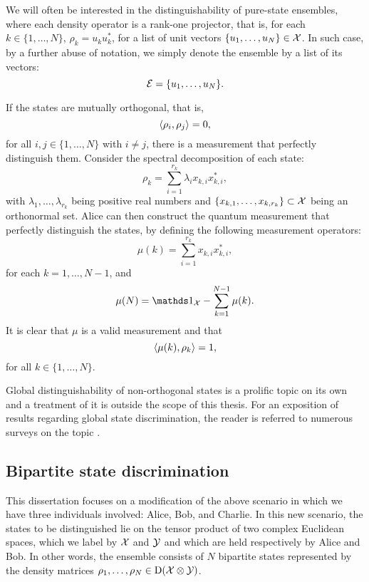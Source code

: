 We will often be interested in the distinguishability of pure-state ensembles,
where each density operator is a rank-one projector, that is, for each 
$k \in \{1, \ldots, N\}$, $\rho_{k} = u_{k}u_{k}^{\ast}$, 
for a list of unit vectors $\{u_{1}, \ldots, u_{N}\} \in \mathcal{X}$. 
In such case, by a further abuse of notation, we simply denote the ensemble by 
a list of its vectors:
\begin{equation}
  \mathcal{E} = \{u_{1}, \ldots, u_{N}\}.
\end{equation}

If the states are mutually orthogonal, that is,
\begin{equation}
\langle \rho_{i} , \rho_{j}\rangle = 0,
\end{equation}
for all $i,j \in \{1, \ldots, N\}$ with $i \neq j$, there is a measurement
that perfectly distinguish them.
Consider the spectral decomposition of each state:
\begin{equation}
  \rho_{k} = \sum_{i=1}^{r_{k}}\lambda_{i}x_{k,i}x_{k,i}^{\ast},
\end{equation}
with $\lambda_{1}, \ldots, \lambda_{r_{k}}$ being positive real numbers
and $\{x_{k,1}, \ldots, x_{k,r_{k}}\} \subset \mathcal{X}$ being an orthonormal set.
Alice can then construct the quantum measurement that perfectly distinguish 
the states, by defining the following measurement operators:
\begin{equation}
  \mu(k) = \sum_{i=1}^{r_{k}}x_{k,i}x_{k,i}^{\ast},
\end{equation}
for each $k = 1,\ldots,N-1$, and 
\begin{equation}
  \mu(N) = \I_{\X} - \sum_{k=1}^{N-1}\mu(k).
\end{equation}
It is clear that $\mu$ is a valid measurement and that
\begin{equation}
  \langle \mu(k) , \rho_{k}\rangle = 1,
\end{equation}
for all $k \in \{1, \ldots, N\}$. 

Global distinguishability of non-orthogonal states is a prolific topic on its own and 
a treatment of it is outside the scope of this thesis.
For an exposition of results regarding global state discrimination, 
the reader is referred to numerous surveys on the topic \cite{Chefles2000, Bergou2004}.

\subsection*{Bipartite state discrimination}
This dissertation focuses on a modification of the above scenario in which we 
have three individuals involved: Alice, Bob, and Charlie.
In this new scenario, the states to be distinguished lie on the tensor product of 
two complex Euclidean spaces, which we label by $\mathcal{X}$ and $\mathcal{Y}$ and which are 
held respectively by Alice and Bob.
In other words, the ensemble consists of $N$ bipartite states represented 
by the density matrices $\rho_{1}, \ldots, \rho_{N} \in \mathrm{D}(\mathcal{X}\otimes\mathcal{Y})$.

